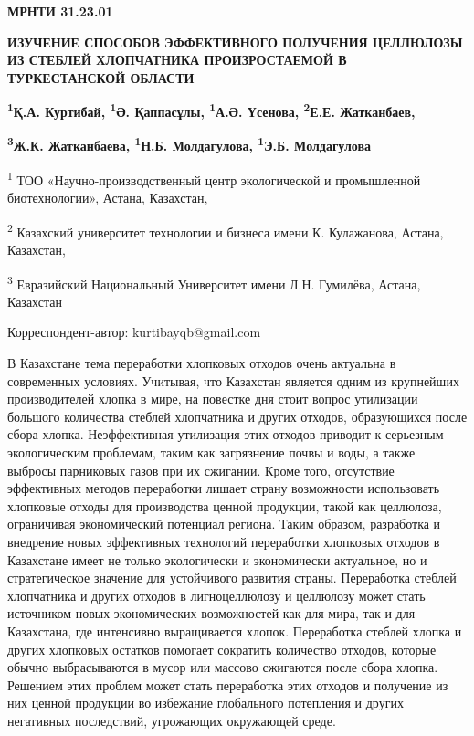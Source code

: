 \newpage
{\bfseries МРНТИ 31.23.01}

{\bfseries ИЗУЧЕНИЕ СПОСОБОВ ЭФФЕКТИВНОГО ПОЛУЧЕНИЯ ЦЕЛЛЮЛОЗЫ ИЗ СТЕБЛЕЙ
ХЛОПЧАТНИКА ПРОИЗРОСТАЕМОЙ В ТУРКЕСТАНСКОЙ ОБЛАСТИ}

{\bfseries \textsuperscript{1}Қ.А. Куртибай, \textsuperscript{1}Ә.
Қаппасұлы, \textsuperscript{1}А.Ә. Үсенова, \textsuperscript{2}Е.Е.
Жатканбаев,}

{\bfseries \textsuperscript{3}Ж.К. Жатканбаева, \textsuperscript{1}Н.Б.
Молдагулова, \textsuperscript{1}Э.Б. Молдагулова}

\textsuperscript{1} ТОО «Научно-производственный центр экологической и
промышленной биотехнологии», Астана, Казахстан,

\textsuperscript{2} Казахский университет технологии и бизнеса имени К.
Кулажанова, Астана, Казахстан,

\textsuperscript{3} Евразийский Национальный Университет имени Л.Н.
Гумилёва, Астана, Казахстан

Корреспондент-автор: kurtibayqb@gmail.com

В Казахстане тема переработки хлопковых отходов очень актуальна в
современных условиях. Учитывая, что Казахстан является одним из
крупнейших производителей хлопка в мире, на повестке дня стоит вопрос
утилизации большого количества стеблей хлопчатника и других отходов,
образующихся после сбора хлопка. Неэффективная утилизация этих отходов
приводит к серьезным экологическим проблемам, таким как загрязнение
почвы и воды, а также выбросы парниковых газов при их сжигании. Кроме
того, отсутствие эффективных методов переработки лишает страну
возможности использовать хлопковые отходы для производства ценной
продукции, такой как целлюлоза, ограничивая экономический потенциал
региона. Таким образом, разработка и внедрение новых эффективных
технологий переработки хлопковых отходов в Казахстане имеет не только
экологически и экономически актуальное, но и стратегическое значение для
устойчивого развития страны. Переработка стеблей хлопчатника и других
отходов в лигноцеллюлозу и целлюлозу может стать источником новых
экономических возможностей как для мира, так и для Казахстана, где
интенсивно выращивается хлопок. Переработка стеблей хлопка и других
хлопковых остатков помогает сократить количество отходов, которые обычно
выбрасываются в мусор или массово сжигаются после сбора хлопка. Решением
этих проблем может стать переработка этих отходов и получение из них
ценной продукции во избежание глобального потепления и других негативных
последствий, угрожающих окружающей среде.

